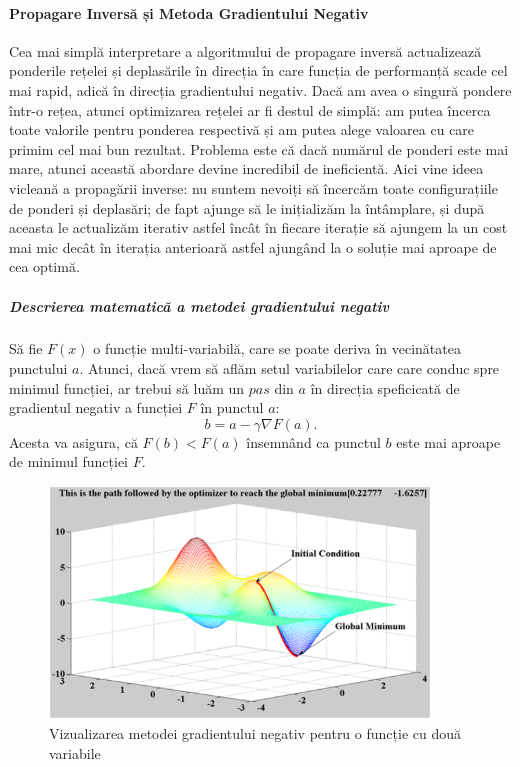 \paragraph{Propagare Inversă și Metoda Gradientului Negativ}
Cea mai simplă interpretare a algoritmului de propagare inversă actualizează ponderile rețelei și deplasările în direcția în care funcția de performanță scade cel mai rapid, adică în direcția gradientului negativ.\newline
Dacă am avea o singură pondere într-o rețea, atunci optimizarea rețelei ar fi destul de simplă: am putea încerca toate valorile pentru ponderea respectivă și am putea alege valoarea cu care primim cel mai bun rezultat. Problema este că dacă numărul de ponderi este mai mare, atunci această abordare devine incredibil de ineficientă. Aici vine ideea vicleană a propagării inverse: nu suntem nevoiți să încercăm toate configurațiile de ponderi și deplasări; de fapt ajunge să le inițializăm la întâmplare, și după aceasta le actualizăm iterativ astfel încât în fiecare iterație să ajungem la un cost mai mic decât în iterația anterioară astfel ajungând la o soluție mai aproape de cea optimă.\newline


\subparagraph{Descrierea matematică a metodei gradientului negativ}
Să fie $F(x)$ o funcție multi-variabilă, care se poate deriva în vecinătatea punctului $a$. Atunci, dacă vrem să aflăm setul variabilelor care care conduc spre minimul funcției, ar trebui să luăm un $pas$ din $a$ în direcția speficicată de gradientul negativ a funcției $F$ în punctul $a$:
\begin{equation}
	b = a - \gamma \nabla F(a).
\end{equation}
Acesta va asigura, că $F(b) < F(a)$ însemnând ca punctul $b$ este mai aproape de minimul funcției $F$.


\begin{figure}[h!]
    	\centering
	\captionsetup{justification=centering, margin=2cm}
	\includegraphics[width=0.9\textwidth]{figures/gradient_descent.png}
	\caption{Vizualizarea metodei gradientului negativ pentru o funcție cu două variabile \cite{arn}}
	\label{fig:gradient_descent}
\end{figure}

